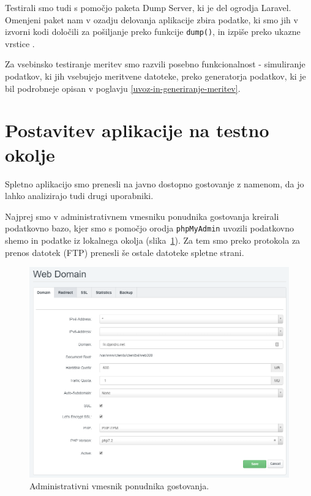 \documentclass[a4paper, 12pt]{book}
\begin{document}
Testirali smo tudi s pomočjo paketa Dump Server, ki je del ogrodja Laravel. Omenjeni paket nam v ozadju delovanja aplikacije zbira podatke, ki smo jih v izvorni kodi določili za pošiljanje preko funkcije \verb=dump()=, in izpiše preko ukazne vrstice \cite{laravel-dump}.

Za vsebinsko testiranje meritev smo razvili posebno funkcionalnost - simuliranje podatkov, ki jih vsebujejo meritvene datoteke, preko generatorja podatkov, ki je bil podrobneje opisan v poglavju \ref{uvoz-in-generiranje-meritev}.


\section{Postavitev aplikacije na testno okolje}

Spletno aplikacijo smo prenesli na javno dostopno gostovanje z namenom, da jo lahko analizirajo tudi drugi uporabniki.

Najprej smo v administrativnem vmesniku ponudnika gostovanja kreirali podatkovno bazo, kjer smo s pomočjo orodja \verb=phpMyAdmin= \cite{phpmyadmin-framework} uvozili podatkovno shemo in podatke iz lokalnega okolja (slika~\ref{ss-admim-gui}). Za tem smo preko protokola za prenos datotek (FTP) prenesli še ostale datoteke spletne strani.

\begin{figure}[h]
\begin{center}
\includegraphics[width=\textwidth]{slike/admin_vmesnik.png}
\end{center}
\caption{Administrativni vmesnik ponudnika gostovanja.}
\label{ss-admim-gui}
\end{figure}
\end{document}
